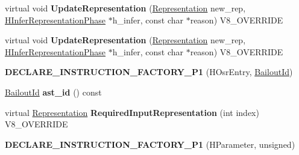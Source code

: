 \begin{DoxyCompactItemize}
\item 
\hypertarget{classv8_1_1internal_1_1_v8___f_i_n_a_l_a646a7a4ee98ffeb1773e958bd227f429}{}virtual void {\bfseries Update\+Representation} (\hyperlink{classv8_1_1internal_1_1_representation}{Representation} new\+\_\+rep, \hyperlink{classv8_1_1internal_1_1_h_infer_representation_phase}{H\+Infer\+Representation\+Phase} $\ast$h\+\_\+infer, const char $\ast$reason) V8\+\_\+\+O\+V\+E\+R\+R\+I\+D\+E\label{classv8_1_1internal_1_1_v8___f_i_n_a_l_a646a7a4ee98ffeb1773e958bd227f429}

\item 
\hypertarget{classv8_1_1internal_1_1_v8___f_i_n_a_l_a646a7a4ee98ffeb1773e958bd227f429}{}virtual void {\bfseries Update\+Representation} (\hyperlink{classv8_1_1internal_1_1_representation}{Representation} new\+\_\+rep, \hyperlink{classv8_1_1internal_1_1_h_infer_representation_phase}{H\+Infer\+Representation\+Phase} $\ast$h\+\_\+infer, const char $\ast$reason) V8\+\_\+\+O\+V\+E\+R\+R\+I\+D\+E\label{classv8_1_1internal_1_1_v8___f_i_n_a_l_a646a7a4ee98ffeb1773e958bd227f429}

\item 
\hypertarget{classv8_1_1internal_1_1_v8___f_i_n_a_l_a03db74f6399ed3febb36c47a9b450bb2}{}{\bfseries D\+E\+C\+L\+A\+R\+E\+\_\+\+I\+N\+S\+T\+R\+U\+C\+T\+I\+O\+N\+\_\+\+F\+A\+C\+T\+O\+R\+Y\+\_\+\+P1} (H\+Osr\+Entry, \hyperlink{classv8_1_1internal_1_1_bailout_id}{Bailout\+Id})\label{classv8_1_1internal_1_1_v8___f_i_n_a_l_a03db74f6399ed3febb36c47a9b450bb2}

\item 
\hypertarget{classv8_1_1internal_1_1_v8___f_i_n_a_l_a8cbe8c507396bdc04db496776313342a}{}\hyperlink{classv8_1_1internal_1_1_bailout_id}{Bailout\+Id} {\bfseries ast\+\_\+id} () const \label{classv8_1_1internal_1_1_v8___f_i_n_a_l_a8cbe8c507396bdc04db496776313342a}

\item 
\hypertarget{classv8_1_1internal_1_1_v8___f_i_n_a_l_a6c6d1f37f40b113d8f4062f1ffff7215}{}virtual \hyperlink{classv8_1_1internal_1_1_representation}{Representation} {\bfseries Required\+Input\+Representation} (int index) V8\+\_\+\+O\+V\+E\+R\+R\+I\+D\+E\label{classv8_1_1internal_1_1_v8___f_i_n_a_l_a6c6d1f37f40b113d8f4062f1ffff7215}

\item 
\hypertarget{classv8_1_1internal_1_1_v8___f_i_n_a_l_aa320a5ee46ca05680bef214c7bd3ecdb}{}{\bfseries D\+E\+C\+L\+A\+R\+E\+\_\+\+I\+N\+S\+T\+R\+U\+C\+T\+I\+O\+N\+\_\+\+F\+A\+C\+T\+O\+R\+Y\+\_\+\+P1} (H\+Parameter, unsigned)\label{classv8_1_1internal_1_1_v8___f_i_n_a_l_aa320a5ee46ca05680bef214c7bd3ecdb}


\end{DoxyCompactItemize}
